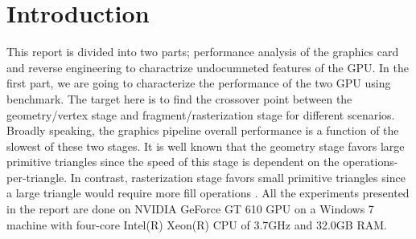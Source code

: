 \section{Introduction}
This report is divided into two parts; performance analysis of the graphics card and reverse engineering to charactrize undocumneted features of the GPU. In the first part, we are going to characterize the performance of the two GPU using \protect{\wes} benchmark. The target here is to find the crossover point between the geometry/vertex stage and fragment/rasterization stage for different scenarios. Broadly speaking, the graphics pipeline overall performance is a function of the slowest of these two stages. It is well known that the geometry stage favors large primitive triangles since the speed of this stage is dependent on the operations-per-triangle. In contrast, rasterization stage favors small primitive triangles since a large triangle would require more fill operations \cite{Bethel_2010}. All the experiments presented in the report are done on NVIDIA GeForce GT 610 GPU on a Windows 7 machine with four-core Intel(R) Xeon(R) CPU of 3.7GHz and 32.0GB RAM.

